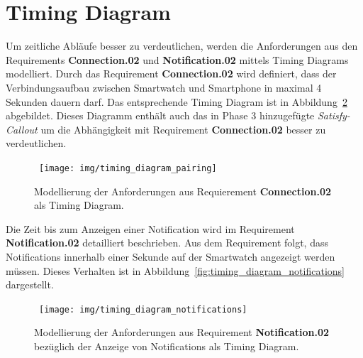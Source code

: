 \section{Timing Diagram}
Um zeitliche Abläufe besser zu verdeutlichen, werden die Anforderungen aus den Requirements \textbf{Connection.02} und \textbf{Notification.02} mittels Timing Diagrams modelliert. Durch das Requirement \textbf{Connection.02} wird definiert, dass der Verbindungsaufbau zwischen Smartwatch und Smartphone in maximal 4 Sekunden dauern darf. Das entsprechende Timing Diagram ist in Abbildung~\ref{fig:timing_diagram_pairing} abgebildet. Dieses Diagramm enthält auch das in Phase 3 hinzugefügte \textit{Satisfy-Callout} um die Abhängigkeit mit Requirement \textbf{Connection.02} besser zu verdeutlichen.

\begin{figure}
\centering\
\texttt{[image: img/timing\_diagram\_pairing]}
\caption[Timing Diagram: Pairing]{Modellierung der Anforderungen aus Requierement \textbf{Connection.02} als Timing Diagram. }
\label{fig:timing_diagram_pairing}
\end{figure}

Die Zeit bis zum Anzeigen einer \gls{Notification} wird im Requirement \textbf{Notification.02} detailliert beschrieben. Aus dem Requirement folgt, dass \glspl{Notification} innerhalb einer Sekunde auf der Smartwatch angezeigt werden müssen. Dieses Verhalten ist in Abbildung~\ref{fig:timing_diagram_notifications} dargestellt.

\begin{figure}
\centering\
\texttt{[image: img/timing\_diagram\_notifications]}
\caption[Timing Diagram: Notifications]{Modellierung der Anforderungen aus Requirement \textbf{Notification.02} bezüglich der Anzeige von \glspl{Notification} als Timing Diagram.}
\label{fig:timing_diagram_pairing}
\end{figure}
